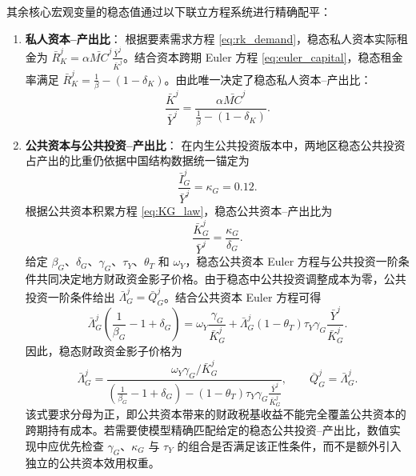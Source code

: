 \documentclass[12pt,UTF8]{ctexart}
\begin{document}
	其余核心宏观变量的稳态值通过以下联立方程系统进行精确配平：
	\begin{enumerate}
		\item \textbf{私人资本--产出比}：
		根据要素需求方程 \eqref{eq:rk_demand}，稳态私人资本实际租金为 $\bar{R}_K^j = \alpha \bar{MC}^j \frac{\bar{Y}^j}{\bar{K}^j}$。结合资本跨期 Euler 方程 \eqref{eq:euler_capital}，稳态租金率满足 $\bar{R}_K^j = \frac{1}{\beta} - (1-\delta_K)$。由此唯一决定了稳态私人资本--产出比：
		\begin{equation}
			\frac{\bar{K}^j}{\bar{Y}^j} = \frac{\alpha \bar{MC}^j}{\frac{1}{\beta} - (1-\delta_K)}.
		\end{equation}
		
		\item \textbf{公共资本与公共投资--产出比}：
		在内生公共投资版本中，两地区稳态公共投资占产出的比重仍依据中国结构数据统一锚定为
		\begin{equation}
			\frac{\bar I_G^j}{\bar Y^j}=\kappa_G=0.12.
		\end{equation}
		根据公共资本积累方程 \eqref{eq:KG_law}，稳态公共资本--产出比为
		\begin{equation}
			\frac{\bar K_G^j}{\bar Y^j}=\frac{\kappa_G}{\delta_G}.
		\end{equation}
		给定 $\beta_G$、$\delta_G$、$\gamma_G$、$\tau_Y$、$\theta_T$ 和 $\omega_Y$，稳态公共资本 Euler 方程与公共投资一阶条件共同决定地方财政资金影子价格。由于稳态中公共投资调整成本为零，公共投资一阶条件给出 $\bar\Lambda_G^j=\bar Q_G^j$。结合公共资本 Euler 方程可得
		\begin{equation}
			\bar\Lambda_G^j\left(\frac{1}{\beta_G}-1+\delta_G\right)
			=
			\omega_Y\frac{\gamma_G}{\bar K_G^j}
			+
			\bar\Lambda_G^j(1-\theta_T)\tau_Y\gamma_G\frac{\bar Y^j}{\bar K_G^j}.
		\end{equation}
		因此，稳态财政资金影子价格为
		\begin{equation}
			\bar\Lambda_G^j
			=
			\frac{\omega_Y\gamma_G/\bar K_G^j}
			{\left(\frac{1}{\beta_G}-1+\delta_G\right)-(1-\theta_T)\tau_Y\gamma_G\frac{\bar Y^j}{\bar K_G^j}},
			\qquad
			\bar Q_G^j=\bar\Lambda_G^j.
		\end{equation}
		该式要求分母为正，即公共资本带来的财政税基收益不能完全覆盖公共资本的跨期持有成本。若需要使模型精确匹配给定的稳态公共投资--产出比，数值实现中应优先检查 $\gamma_G$、$\kappa_G$ 与 $\tau_Y$ 的组合是否满足该正性条件，而不是额外引入独立的公共资本效用权重。
		

\end{enumerate}
\end{document}

